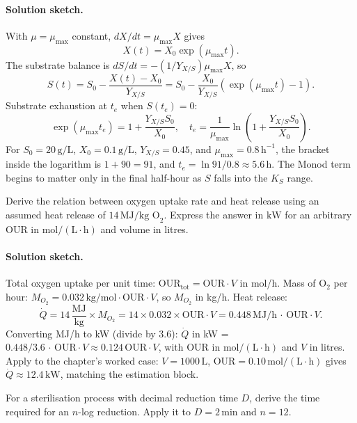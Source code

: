 \paragraph{Solution sketch.}
With $\mu = \mu_{\max}$ constant, $dX/dt = \mu_{\max} X$ gives
\[
X(t) = X_0 \exp(\mu_{\max} t).
\]
The substrate balance is $dS/dt = -(1/Y_{X/S}) \mu_{\max} X$, so
\[
S(t) = S_0 - \frac{X(t) - X_0}{Y_{X/S}}
     = S_0 - \frac{X_0}{Y_{X/S}}\left(\exp(\mu_{\max} t) - 1\right).
\]
Substrate exhaustion at $t_e$ when $S(t_e) = 0$:
\[
\exp(\mu_{\max} t_e) = 1 + \frac{Y_{X/S} S_0}{X_0},
\quad
t_e = \frac{1}{\mu_{\max}}
\ln\!\left(1 + \frac{Y_{X/S} S_0}{X_0}\right).
\]
For $S_0 = 20\,\text{g}/\text{L}$, $X_0 = 0.1\,\text{g}/\text{L}$,
$Y_{X/S} = 0.45$, and $\mu_{\max} = 0.8\,\text{h}^{-1}$, the bracket
inside the logarithm is $1 + 90 = 91$, and $t_e = \ln 91 / 0.8
\approx 5.6\,\text{h}$. The Monod term begins to matter only in the
final half-hour as $S$ falls into the $K_S$ range.

\begin{exercise}
Derive the relation between oxygen uptake rate and heat release using
an assumed heat release of $14\,\text{MJ}/\text{kg O}_2$. Express the
answer in $\text{kW}$ for an arbitrary OUR in
$\text{mol}/(\text{L}\cdot\text{h})$ and volume in litres.
\end{exercise}

\paragraph{Solution sketch.}
Total oxygen uptake per unit time: $\text{OUR}_{\text{tot}} =
\text{OUR}\cdot V$ in mol/h. Mass of O$_2$ per hour:
$M_{O_2} = 0.032\,\text{kg/mol} \cdot \text{OUR}\cdot V$, so
$M_{O_2}$ in kg/h. Heat release:
\[
\dot Q = 14\,\frac{\text{MJ}}{\text{kg}} \times M_{O_2}
       = 14 \times 0.032 \times \text{OUR}\cdot V
       = 0.448\,\text{MJ/h}\,\cdot\,\text{OUR}\cdot V.
\]
Converting MJ/h to kW (divide by 3.6): $\dot Q$ in kW =
$0.448/3.6\,\cdot\,\text{OUR}\cdot V \approx 0.124\,\text{OUR}\cdot V$,
with OUR in $\text{mol}/(\text{L}\cdot\text{h})$ and $V$ in litres.
Apply to the chapter's worked case: $V = 1000\,\text{L}$,
$\text{OUR} = 0.10\,\text{mol}/(\text{L}\cdot\text{h})$ gives
$\dot Q \approx 12.4\,\text{kW}$, matching the estimation block.

\begin{exercise}
For a sterilisation process with decimal reduction time $D$, derive the
time required for an $n$-log reduction. Apply it to $D=2\,\text{min}$
and $n=12$.
\end{exercise}

